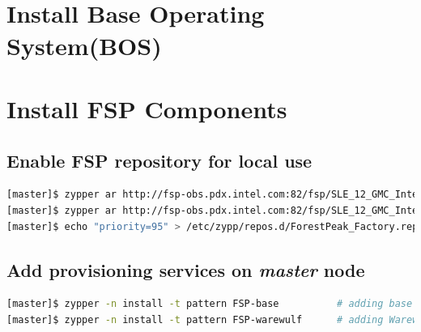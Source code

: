 \documentclass[letterpaper]{article}
\begin{document}
 \\

 \\




\section{Install Base Operating System(BOS)}



\section{Install FSP Components} \label{sec:basic_install}


\subsection{Enable FSP repository for local use}


\begin{lstlisting}[language=bash]
[master]$ zypper ar http://fsp-obs.pdx.intel.com:82/fsp/SLE_12_GMC_Intel/fsp.repo
[master]$ zypper ar http://fsp-obs.pdx.intel.com:82/fsp/SLE_12_GMC_Intel/ForestPeak:Factory.repo
[master]$ echo "priority=95" > /etc/zypp/repos.d/ForestPeak_Factory.repo
\end{lstlisting}


\subsection{Add provisioning services on {\em master} node}


\begin{lstlisting}[language=bash,keywords={}]
[master]$ zypper -n install -t pattern FSP-base          # adding base FSP packages
[master]$ zypper -n install -t pattern FSP-warewulf      # adding Warewulf support
\end{lstlisting}
\end{document}
